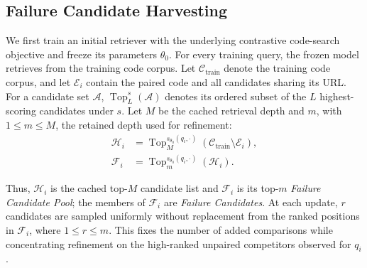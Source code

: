 \documentclass[11pt]{article}
\begin{document}
\subsection{Failure Candidate Harvesting}
\label{sec:failure_harvesting}

We first train an initial retriever with the underlying contrastive code-search objective and freeze its parameters \(\theta_0\). For every training query, the frozen model retrieves from the training code corpus. Let \(\mathcal{C}_{\mathrm{train}}\) denote the training code corpus, and let \(\mathcal{E}_i\) contain the paired code and all candidates sharing its URL. For a candidate set \(\mathcal{A}\), \(\operatorname{Top}_{L}^{s}(\mathcal{A})\) denotes its ordered subset of the \(L\) highest-scoring candidates under \(s\). Let \(M\) be the cached retrieval depth and \(m\), with \(1\leq m\leq M\), the retained depth used for refinement:
\begin{equation}
  \begin{aligned}
    \mathcal{H}_i
    &=\operatorname{Top}_{M}^{s_{\theta_0}(q_i,\cdot)}
      (\mathcal{C}_{\mathrm{train}}\setminus\mathcal{E}_i), \\
    \mathcal{F}_i
    &=\operatorname{Top}_{m}^{s_{\theta_0}(q_i,\cdot)}(\mathcal{H}_i).
  \end{aligned}
  \label{eq:fc_pool}
\end{equation}

Thus, \(\mathcal{H}_i\) is the cached top-\(M\) candidate list and \(\mathcal{F}_i\) is its top-\(m\) \emph{Failure Candidate Pool}; the members of \(\mathcal{F}_i\) are \emph{Failure Candidates}. At each update, \(r\) candidates are sampled uniformly without replacement from the ranked positions in \(\mathcal{F}_i\), where \(1\leq r\leq m\). This fixes the number of added comparisons while concentrating refinement on the high-ranked unpaired competitors observed for \(q_i\).
\end{document}
